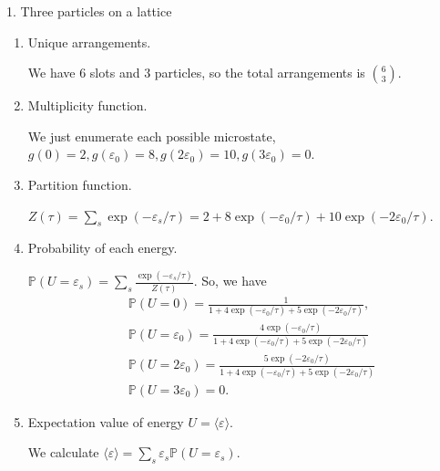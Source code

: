 \documentclass[11pt]{article}
\begin{document}
\begin{problem}{1. Three particles on a lattice}\hfill
\begin{enumerate}[label=(\alph*)]
  \item Unique arrangements.
        \begin{answer}
          We have \( 6 \) slots and \( 3 \) particles, so the total arrangements is \(\binom{6}{3}\).
        \end{answer}
  \item Multiplicity function.
        \begin{answer}
        We just enumerate each possible microstate, \( g(0) = 2, g(\varepsilon_0) = 8, g(2\varepsilon_0) = 10, g(3\varepsilon_0) = 0 \).
        \end{answer}
  \item Partition function.
        \begin{answer}
        \( Z(\tau) = \sum\limits_s \exp(-\varepsilon_s/\tau) = 2 + 8\exp(-\varepsilon_0/\tau) + 10\exp(-2\varepsilon_0/\tau)\).
        \end{answer}
  \item Probability of each energy.
        \begin{answer}
          \( \mathbb{P}(U = \varepsilon_s) = \sum\limits_s \frac{\exp(-\varepsilon_{s}/\tau)}{Z(\tau)} \).
          So, we have
          \begin{equation}
          \label{eq:1}
            \begin{aligned}
              &\mathbb{P}(U=0) = \frac{1}{1 + 4\exp(-\varepsilon_{0}/\tau) + 5\exp(-2\varepsilon_0/\tau)}, \\[1.5ex]
              &\mathbb{P}(U= \varepsilon_0) = \frac{4\exp(-\varepsilon_{0}/\tau)}{1 + 4\exp(-\varepsilon_0/\tau) + 5\exp(-2\varepsilon_0/\tau)} \\[1.5ex]
              &\mathbb{P}(U=2\varepsilon_0) = \frac{5\exp(-2\varepsilon_{0}/\tau)}{1 + 4\exp(-\varepsilon_0/\tau) + 5\exp(-2\varepsilon_0/\tau)} \\[1.5ex]
                &\mathbb{P}(U=3\varepsilon_0) = 0.
            \end{aligned}
          \end{equation}
        \end{answer}
        \item Expectation value of energy \( U = \langle\varepsilon\rangle \).
        \begin{answer}
          We calculate \(\langle\varepsilon\rangle = \sum\limits_s \varepsilon_s \mathbb{P}(U=\varepsilon_s)\).

\end{answer}
\end{enumerate}
\end{problem}
\end{document}
